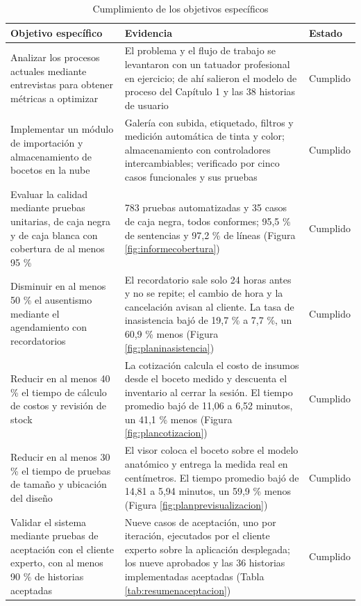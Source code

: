 \documentclass[12pt,letterpaper,oneside]{report}
\begin{document}
\begin{table}[H]
  \centering
  \caption{Cumplimiento de los objetivos específicos}
  \label{tab:cumplimiento}
  \renewcommand{\arraystretch}{1.2}
  \footnotesize
  \begin{tabular}{|p{4.3cm}|p{6.6cm}|p{2.3cm}|}
    \hline
    \textbf{Objetivo específico} & \textbf{Evidencia} & \textbf{Estado} \\
    \hline
    Analizar los procesos actuales mediante entrevistas para obtener métricas a optimizar
    & El problema y el flujo de trabajo se levantaron con un tatuador profesional en ejercicio; de ahí salieron el modelo de proceso del Capítulo 1 y las 38 historias de usuario
    & Cumplido \\ \hline
    Implementar un módulo de importación y almacenamiento de bocetos en la nube
    & Galería con subida, etiquetado, filtros y medición automática de tinta y color; almacenamiento con controladores intercambiables; verificado por cinco casos funcionales y sus pruebas
    & Cumplido \\ \hline
    Evaluar la calidad mediante pruebas unitarias, de caja negra y de caja blanca con cobertura de al menos 95 \%
    & 783 pruebas automatizadas y 35 casos de caja negra, todos conformes; 95,5 \% de sentencias y 97,2 \% de líneas (Figura \ref{fig:informecobertura})
    & Cumplido \\ \hline
    Disminuir en al menos 50 \% el ausentismo mediante el agendamiento con recordatorios
    & El recordatorio sale solo 24 horas antes y no se repite; el cambio de hora y la cancelación avisan al cliente. La tasa de inasistencia bajó de 19,7 \% a 7,7 \%, un 60,9 \% menos (Figura \ref{fig:planinasistencia})
    & Cumplido \\ \hline
    Reducir en al menos 40 \% el tiempo de cálculo de costos y revisión de stock
    & La cotización calcula el costo de insumos desde el boceto medido y descuenta el inventario al cerrar la sesión. El tiempo promedio bajó de 11,06 a 6,52 minutos, un 41,1 \% menos (Figura \ref{fig:plancotizacion})
    & Cumplido \\ \hline
    Reducir en al menos 30 \% el tiempo de pruebas de tamaño y ubicación del diseño
    & El visor coloca el boceto sobre el modelo anatómico y entrega la medida real en centímetros. El tiempo promedio bajó de 14,81 a 5,94 minutos, un 59,9 \% menos (Figura \ref{fig:planprevisualizacion})
    & Cumplido \\ \hline
    Validar el sistema mediante pruebas de aceptación con el cliente experto, con al menos 90 \% de historias aceptadas
    & Nueve casos de aceptación, uno por iteración, ejecutados por el cliente experto sobre la aplicación desplegada; los nueve aprobados y las 36 historias implementadas aceptadas (Tabla \ref{tab:resumenaceptacion})
    & Cumplido \\ \hline
  \end{tabular}
\end{table}
\end{document}
